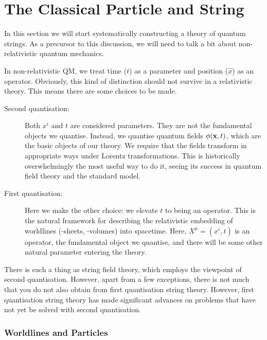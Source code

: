 
\chapter{The Classical Particle and String}%
\label{cha:the_classical_particle_and_string}

In this section we will start systematically constructing a theory of quantum strings.
As a precursor to this discussion, we will need to talk a bit about non-relativistic quantum mechanics.

In non-relativistic QM, we treat time ($t$) as a parameter and position ($\hat{x}$) as an operator.
Obviously, this kind of distinction should not survive in a relativistic theory. This means there are some choices to be made. 

\begin{description}
  \item[Second quantisation:] Both $x^{i}$ and $t$ are considered parameters. They are not the fundamental objects we quantise. Instead, we quantise quantum fields $\phi(\vb{x}, t)$, which are the basic objects of our theory.
    We require that the fields transform in appropriate ways under Lorentz transformations.
    This is historically overwhelmingly the most useful way to do it, seeing its success in quantum field theory and the standard model.
  \item[First quantisation:] Here we make the other choice: we elevate $t$ to being an operator.
    This is the natural framework for describing the relativistic embedding of worldlines (-sheets, -volumes) into spacetime.
    Here, $X^{\mu} = (x^{i}, t)$ is an operator, the fundamental object we quantise, and there will be some other natural parameter entering the theory.
\end{description}

There is such a thing as string field theory, which employs the viewpoint of second quantisation. However, apart from a few exceptions, there is not much that you do not also obtain from first quantisation string theory.
However, first quantisation string theory has made significant advances on problems that have not yet be solved with second quantisation.

\subsection{Worldlines and Particles}%
\label{sub:worldlines_and_particles}

